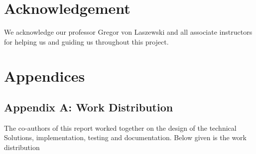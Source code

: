 \documentclass[9pt,twocolumn,twoside]{../../styles/osajnl}
\begin{document}
\section{Acknowledgement}

We acknowledge our professor Gregor von Laszewski and all associate instructors for helping us and guiding us throughout this project.

\section{Appendices}
\subsection{Appendix A: Work Distribution}
The co-authors of this report worked together on the design of the technical
Solutions, implementation, testing and documentation. Below given is the work
 distribution
\end{document}
